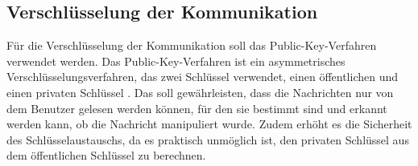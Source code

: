 \subsection{Verschlüsselung der Kommunikation}


Für die Verschlüsselung der Kommunikation soll das Public-Key-Verfahren verwendet werden.
Das Public-Key-Verfahren ist ein asymmetrisches Verschlüsselungsverfahren, das zwei Schlüssel verwendet,
einen öffentlichen und einen privaten Schlüssel \parencite[S. 11-13]{Wong_KryptoPraxis}. Das soll gewährleisten, dass die Nachrichten nur von
dem Benutzer gelesen werden können, für den sie bestimmt sind und erkannt werden kann, ob die Nachricht
manipuliert wurde. Zudem erhöht es die Sicherheit des Schlüsselaustauschs, da es praktisch unmöglich ist,
den privaten Schlüssel aus dem öffentlichen Schlüssel zu berechnen.





